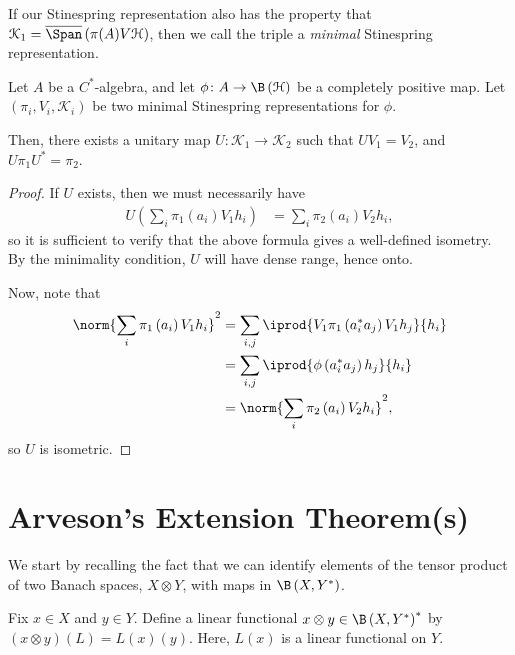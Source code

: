 \documentclass[10pt]{mypackage}
\begin{document}
If our Stinespring representation also has the property that $\mathcal{K}_1 = \overline{\Span}\left( \pi(A)V\mathcal{H} \right)$, then we call the triple a \textit{minimal} Stinespring representation.
\begin{proposition}
  Let $A$ be a $C^{\ast}$-algebra, and let $\phi\colon A\rightarrow \B\left( \mathcal{H} \right)$ be a completely positive map. Let $\left( \pi_i,V_i,\mathcal{K}_i \right)$ be two minimal Stinespring representations for $\phi$.\newline

  Then, there exists a unitary map $U\colon \mathcal{K}_1\rightarrow \mathcal{K}_2$ such that $UV_1 = V_2$, and $U\pi_1U^{\ast} = \pi_2$.
\end{proposition}
\begin{proof}
  If $U$ exists, then we must necessarily have
  \begin{align*}
    U\left( \sum_{i}\pi_1\left( a_i \right)V_1h_i \right) &= \sum_{i}\pi_2\left( a_i \right)V_2h_i,
  \end{align*}
  so it is sufficient to verify that the above formula gives a well-defined isometry. By the minimality condition, $U$ will have dense range, hence onto.\newline

  Now, note that
  \begin{align*}
    \norm{\sum_{i}\pi_1\left( a_i \right)V_1h_i}^2 &= \sum_{i,j} \iprod{V_1\pi_1\left( a_i^{\ast}a_j \right)V_1h_j}{h_i}\\
                                                   &= \sum_{i,j} \iprod{\phi\left( a_i^{\ast}a_j \right)h_j}{h_i}\\
                                                   &= \norm{\sum_{i}\pi_2\left( a_i \right)V_2h_i}^2,
  \end{align*}
  so $U$ is isometric.
\end{proof}
\section{Arveson's Extension Theorem(s)}%
We start by recalling the fact that we can identify elements of the tensor product of two Banach spaces, $X\otimes Y$, with maps in $\B\left( X,Y^{\ast} \right)$.\newline

Fix $x\in X$ and $y\in Y$. Define a linear functional $x\otimes y\in \B\left( X,Y^{\ast} \right)^{\ast}$ by $\left( x\otimes y \right)\left( L \right) = L(x)(y)$. Here, $L(x)$ is a linear functional on $Y$.\newline
\end{document}
